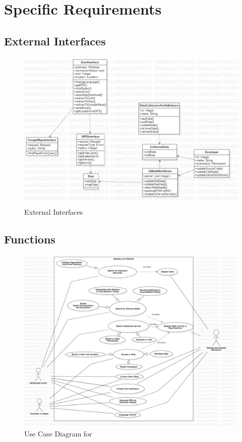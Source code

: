 \section{Specific Requirements}

\subsection{External Interfaces}

\begin{figure}[H]
    \centering
    \includegraphics[width=\textwidth]{img/external-interfaces.jpg}
    \caption{External Interfaces}
\end{figure}

\subsection{Functions}

\begin{figure}[H]
  \centering
  \includegraphics[width=\textwidth]{img/use-case-diagram.jpg}
  \caption{Use Case Diagram for \afetbilgi}
\end{figure}

